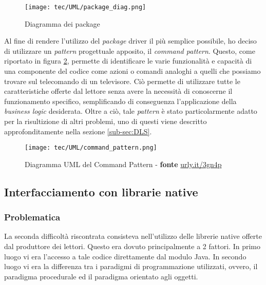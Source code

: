 \begin{figure}[!h] 
    \centering 
    \texttt{[image: tec/UML/package\_diag.png]} 
    \caption{Diagramma dei package}
    \label{package_diag}
\end{figure}

Al fine di rendere l'utilizzo del \emph{package} driver il più semplice possibile, ho deciso di utilizzare un \emph{pattern} progettuale
apposito, il \emph{command pattern}. Questo, come riportato in figura \ref{command_pattern}, permette di identificare le varie
funzionalità e capacità di una componente del codice come azioni o comandi analoghi a quelli che possiamo trovare sul telecomando
di un televisore. Ciò permette di utilizzare tutte le caratteristiche offerte dal lettore senza avere la necessità di conoscerne il
funzionamento specifico, semplificando di conseguenza l'applicazione della \emph{business logic} desiderata.
Oltre a ciò, tale \emph{pattern} è stato particolarmente adatto per la risultizione di altri problemi, uno di questi viene descritto
approfonditamente nella sezione \ref{sub-sec:DLS}.


\begin{figure}[!h] 
    \centering 
    \texttt{[image: tec/UML/command\_pattern.png]} 
    \caption{Diagramma UML del Command Pattern - \textbf{fonte} \url{urly.it/3gn4p}}
    \label{command_pattern}
\end{figure}

\subsection{Interfacciamento con librarie native}
\subsubsection*{Problematica}
La seconda difficoltà riscontrata consisteva nell'utilizzo delle librerie native offerte dal produttore dei lettori.
Questo era dovuto principalmente a 2 fattori. In primo luogo vi era l'accesso a tale codice direttamente dal modulo Java.
In secondo luogo vi era la differenza tra i paradigmi di programmazione utilizzati, ovvero, il paradigma procedurale ed il paradigma
orientato agli oggetti. 

